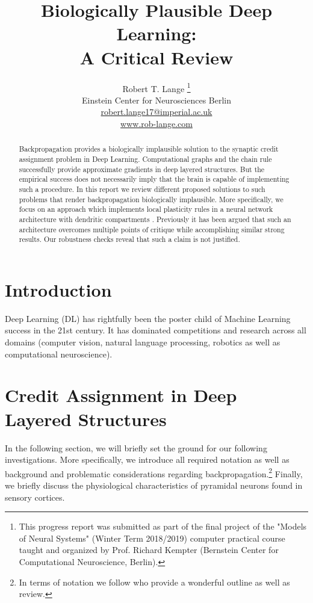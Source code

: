\documentclass[colorinlistoftodos]{article}
\title{Biologically Plausible Deep Learning: \\
		A Critical Review}
\author{
  Robert T. Lange \thanks{This progress report was submitted as part of the final project of the "Models of Neural Systems" (Winter Term 2018/2019) computer practical course taught and organized by Prof. Richard Kempter (Bernstein Center for Computational Neuroscience, Berlin).} \\
  Einstein Center for Neurosciences Berlin\\
  \url{robert.lange17@imperial.ac.uk} \\
  \url{www.rob-lange.com} \\
}
\theoremstyle{definition}
\begin{document}
\maketitle



\begin{abstract}
Backpropagation provides a biologically implausible solution to the synaptic credit assignment problem in Deep Learning. Computational graphs and the chain rule successfully provide approximate gradients in deep layered structures. But the empirical success does not necessarily imply that the brain is capable of implementing such a procedure. 
In this report we review different proposed solutions to such problems that render backpropagation biologically implausible. More specifically, we focus on an approach which implements local plasticity rules in a neural network architecture with dendritic compartments \citep{guerguiev2017}.
Previously it has been argued that such an architecture overcomes multiple points of critique while accomplishing similar strong results. Our robustness checks reveal that such a claim is not justified.
\end{abstract}

\section{Introduction}

Deep Learning (DL) has rightfully been the poster child of Machine Learning success in the 21st century. It has dominated competitions and research across all domains (computer vision, natural language processing, robotics as well as computational neuroscience). 

\newpage
\section{Credit Assignment in Deep Layered Structures}

In the following section, we will briefly set the ground for our following investigations. More specifically, we introduce all required notation as well as background and problematic considerations regarding backpropagation.\footnote{In terms of notation we follow \citet{bartunov2018} who provide a wonderful outline as well as review.} Finally, we briefly discuss the physiological characteristics of pyramidal neurons found in sensory cortices. 
\end{document}
